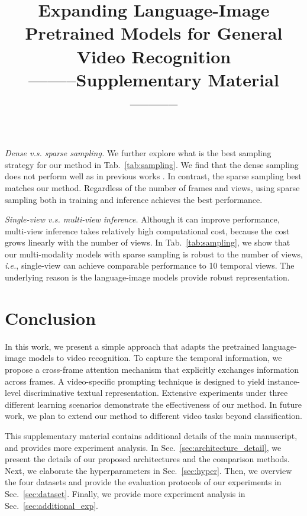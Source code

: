 \documentclass[runningheads]{llncs}
\begin{document}
\textit{Dense v.s. sparse sampling.} We further explore what is the best sampling strategy for our method in Tab.~\ref{tab:sampling}. We find that the dense sampling does not perform well as in previous works \cite{liu2021video,feichtenhofer2019slowfast,arnab2021vivit}. In contrast, the sparse sampling best matches our method. Regardless of the number of frames and views, using sparse sampling both in training and inference achieves the best performance.

\textit{Single-view v.s. multi-view inference.} Although it can improve performance, multi-view inference takes relatively high computational cost, because the cost grows linearly with the number of views. In Tab.~\ref{tab:sampling}, we show that our multi-modality models with sparse sampling is robust to the number of views, \emph{i.e.}, single-view can achieve comparable performance to 10 temporal views. The underlying reason is the language-image models provide robust representation.


\section{Conclusion}
In this work, we present a simple approach that adapts the pretrained language-image models to video recognition. To capture the temporal information, we propose a cross-frame attention mechanism that explicitly exchanges information across frames. A video-specific prompting technique is designed to yield instance-level discriminative textual representation. Extensive experiments under three different learning scenarios demonstrate the effectiveness of our method. In future work, we
plan to extend our method to different video tasks beyond classification.


\clearpage



\title{Expanding Language-Image Pretrained Models for General Video Recognition \\ --------Supplementary Material--------}






\author{ }
\institute{ }


\maketitle
This supplementary material contains additional details of the main manuscript, and provides more experiment analysis. 
In Sec.~\ref{sec:architecture_detail}, we present the details of our proposed architectures and the comparison methods. Next, we elaborate the hyperparameters in Sec.~\ref{sec:hyper}. Then, we overview the four datasets and provide the evaluation protocols of our experiments in Sec.~\ref{sec:dataset}. Finally, we provide more experiment analysis in Sec.~\ref{sec:additional_exp}.
\end{document}
